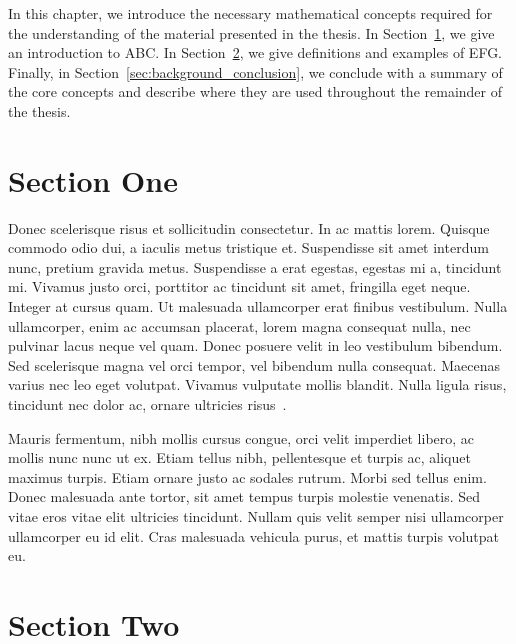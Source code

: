 

In this chapter, we introduce the necessary mathematical concepts required for the understanding of the material presented in the thesis. In Section~\ref{sec:section_one}, we give an introduction to ABC. In Section~\ref{sec:section_two}, we give definitions and examples of EFG. Finally, in Section~\ref{sec:background_conclusion}, we conclude with a summary of the core concepts and describe where they are used throughout the remainder of the thesis.

\section{Section One}
\label{sec:section_one}

Donec scelerisque risus et sollicitudin consectetur. In ac mattis lorem. Quisque commodo odio dui, a iaculis metus tristique et. Suspendisse sit amet interdum nunc, pretium gravida metus. Suspendisse a erat egestas, egestas mi a, tincidunt mi. Vivamus justo orci, porttitor ac tincidunt sit amet, fringilla eget neque. Integer at cursus quam. Ut malesuada ullamcorper erat finibus vestibulum. Nulla ullamcorper, enim ac accumsan placerat, lorem magna consequat nulla, nec pulvinar lacus neque vel quam. Donec posuere velit in leo vestibulum bibendum. Sed scelerisque magna vel orci tempor, vel bibendum nulla consequat. Maecenas varius nec leo eget volutpat. Vivamus vulputate mollis blandit. Nulla ligula risus, tincidunt nec dolor ac, ornare ultricies risus~\cite{Gries1993aa}. \newline

Mauris fermentum, nibh mollis cursus congue, orci velit imperdiet libero, ac mollis nunc nunc ut ex. Etiam tellus nibh, pellentesque et turpis ac, aliquet maximus turpis. Etiam ornare justo ac sodales rutrum. Morbi sed tellus enim. Donec malesuada ante tortor, sit amet tempus turpis molestie venenatis. Sed vitae eros vitae elit ultricies tincidunt. Nullam quis velit semper nisi ullamcorper ullamcorper eu id elit. Cras malesuada vehicula purus, et mattis turpis volutpat eu.


\section{Section Two}
\label{sec:section_two}

